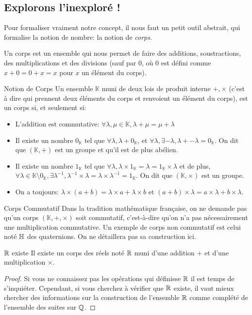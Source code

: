 \documentclass{classe}
\renewcommand*{\K}{\mathbb{K}}
\begin{document}
\subsection{Explorons l'inexploré !}

Pour formaliser vraiment notre concept, il nous faut un petit outil abstrait, qui formalise la notion de nombre: la notion de \emph{corps}.

Un corps est un ensemble qui nous permet de faire des additions, soustractions, des multiplications et des divisions (sauf par $0$, où $0$ est défini comme $x+0 = 0+x = x$ pour $x$ un élément du corps).

\begin{définition}{Notion de Corps}{}
	Un ensemble $\K$ muni de deux lois de produit interne $+, \times$ (c'est à dire qui prennent deux éléments du corps et renvoient un élément du corps), est un corps si, et seulement si:
	\begin{itemize}
		\item L'addition est commutative: $\forall \lambda, \mu \in \K, \lambda + \mu = \mu + \lambda$
		\item Il existe un nombre $0_{\K}$ tel que $\forall \lambda, \lambda + 0_{\K}$, et $\forall \lambda, \exists -\lambda, \lambda + -\lambda = 0_{\K}$. On dit que $\left(\K, +\right)$ est un groupe et qu'il est de plus abélien.
		\item Il existe un nombre $1_{\K}$ tel que $\forall \lambda, \lambda \times 1_{\K} = \lambda = 1_{\K} \times \lambda$ et de plus, $\forall \lambda \in \K\setminus 0_{\K}, \exists \lambda^{-1}, \lambda^{-1} \times \lambda = \lambda \times \lambda^{-1} = 1_{\K}$. On dit que $\left(\K, \times\right)$ est un groupe.
		\item On a toujours: $\lambda \times \left( a + b \right) = \lambda \times a + \lambda \times b$ et $\left( a + b\right)\times \lambda = a\times \lambda + b\times \lambda$.
	\end{itemize}
\end{définition}

\begin{remarque}{Corps Commutatif}{}
	Dans la tradition mathématique française, on ne demande pas qu'un corps $\left( \K, +, \times \right)$ soit commutatif, c'est-à-dire qu'on n'a pas nécessairement une multiplication commutative.
	Un exemple de corps non commutatif est celui noté $\mathbb{H}$ des quaternions. On ne détaillera pas sa construction ici.
\end{remarque}

\begin{théorème}{$\mathbb{R}$ existe}{}
	Il existe un corps des réels noté $\mathbb{R}$ muni d'une addition $+$ et d'une multiplication $\times$.
\end{théorème}
\begin{proof}
	Si vous ne connaissez pas les opérations qui définisse $\mathbb{R}$ il est temps de s'inquiéter. Cependant, si vous cherchez à vérifier que $\mathbb{R}$ existe, il vaut mieux chercher des informations sur la construction de l'ensemble $\mathbb{R}$ comme complété de l'ensemble des suites sur $\mathbb{Q}$.
\end{proof}
\end{document}
